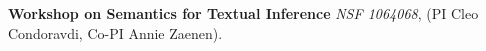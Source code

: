 \documentclass[10pt]{article}
\newcommand{\miniskip}{\vspace*{1mm}}
\begin{document}
\miniskip\noindent
{\bf Workshop on Semantics for Textual Inference}
{\it  NSF  1064068}, (PI Cleo Condoravdi, Co-PI Annie Zaenen).

 \nocite{zaenen+karttunen:2013}
\nocite{csli-gang-cssp13}
\nocite{csli-gang-cil13}
\nocite{faust-adj-pol-lex}

%
%
%
%
%
\end{document}
